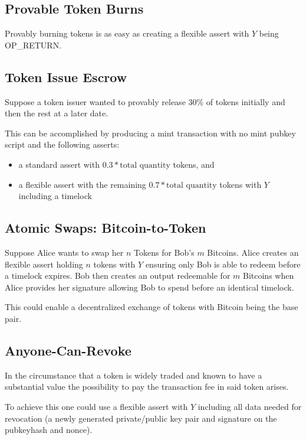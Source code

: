 \documentclass[9pt,oneside]{amsart}
\begin{document}
\subsection{Provable Token Burns}
Provably burning tokens is as easy as creating a flexible assert with $Y$ being OP\_RETURN.
\subsection{Token Issue Escrow}
Suppose a token issuer wanted to provably release 30\% of tokens initially and then the rest at a later date.

This can be accomplished by producing a mint transaction with no mint pubkey script and the following asserts:
\begin{itemize}
    \item a standard assert with $0.3*\text{total quantity}$ tokens, and
    \item a flexible assert with the remaining $0.7*\text{total quantity}$ tokens with $Y$ including a timelock
\end{itemize}

\subsection{Atomic Swaps: Bitcoin-to-Token}
Suppose Alice wants to swap her $n$ Tokens for Bob's $m$ Bitcoins. Alice creates an flexible assert holding $n$ tokens with $Y$ ensuring only Bob is able to redeem before a timelock expires. Bob then creates an output redeemable for $m$ Bitcoins when Alice provides her signature allowing Bob to spend before an identical timelock.

This could enable a decentralized exchange of tokens with Bitcoin being the base pair.

\subsection{Anyone-Can-Revoke}
In the circumstance that a token is widely traded and known to have a substantial value the possibility to pay the transaction fee in said token arises.

To achieve this one could use a flexible assert with $Y$ including all data needed for revocation (a newly generated private/public key pair and signature on the pubkeyhash and nonce).
\end{document}
